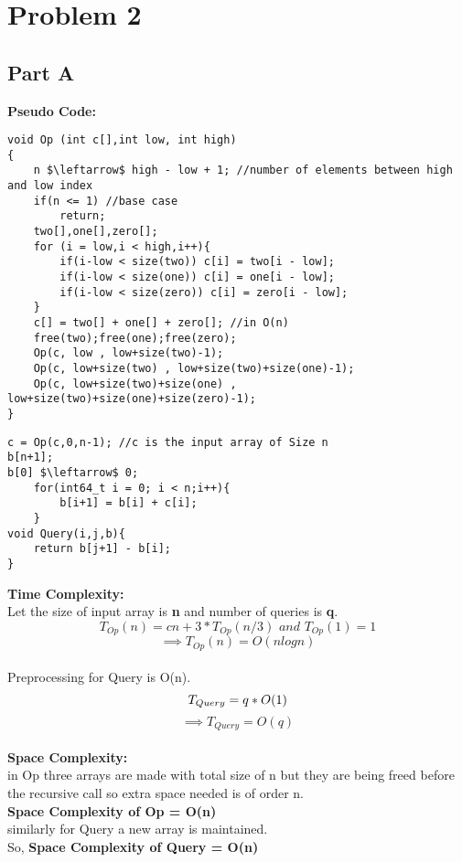 \documentclass[a4paper,11pt]{article}
\theoremstyle{mytheor}
\begin{document}

\section*{Problem 2}
\subsection*{Part A}
\textbf{Pseudo Code: }
\begin{lstlisting}[label={list:first},caption=Op, mathescape = true]
void Op (int c[],int low, int high)
{
	n $\leftarrow$ high - low + 1; //number of elements between high and low index
	if(n <= 1) //base case
	    return;
    two[],one[],zero[];
    for (i = low,i < high,i++){
        if(i-low < size(two)) c[i] = two[i - low];
        if(i-low < size(one)) c[i] = one[i - low];
        if(i-low < size(zero)) c[i] = zero[i - low];
    }
    c[] = two[] + one[] + zero[]; //in O(n)
    free(two);free(one);free(zero);
    Op(c, low , low+size(two)-1);
    Op(c, low+size(two) , low+size(two)+size(one)-1);
    Op(c, low+size(two)+size(one) , low+size(two)+size(one)+size(zero)-1);
}
\end{lstlisting}
\begin{lstlisting}[label={list:first},caption=Query, mathescape = true]
c = Op(c,0,n-1); //c is the input array of Size n
b[n+1];
b[0] $\leftarrow$ 0;
	for(int64_t i = 0; i < n;i++){
		b[i+1] = b[i] + c[i];
	}
void Query(i,j,b){
    return b[j+1] - b[i];
}
\end{lstlisting}

\textbf{Time Complexity: }\\
Let the size of input array is \textbf{n} and number of queries is \textbf{q}.\\
\[T_{Op}(n) = cn + 3 * T_{Op}(n/3) \textit{\ and\ } T_{Op}(1) = 1 \]
\[\implies T_{Op}(n) = O(nlogn)\]\\
Preprocessing for Query is O(n).\\
\[T_{Query} = q * O(1)\\\]
\[\implies T_{Query} = O(q)\]\\

\textbf{Space Complexity: }\\
in Op three arrays are made with total size of n but they are being freed before the recursive call so extra space needed is of order n.\\
\textbf{Space Complexity of Op = O(n)}\\
similarly for Query a new array is maintained.\\
So, \textbf{Space Complexity of Query = O(n)}\\
\end{document}
